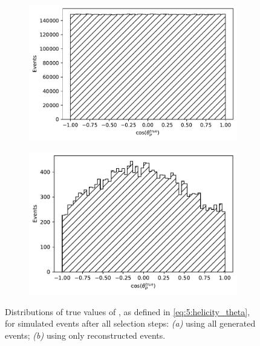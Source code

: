 \begin{figure}[t]
	\centering
	\begin{subfigure}{.45\textwidth}
		\includegraphics[height=.2\textheight]{graphics/05-angular_distributions/MCTRUTH_theta_true.pdf}
		\caption{}
		\label{fig:5:MCTRUTH_theta_true}
	\end{subfigure}
	\begin{subfigure}{.45\textwidth}
		\includegraphics[height=.2\textheight]{graphics/05-angular_distributions/MCRECO_theta_true.pdf}
		\caption{}
		\label{fig:5:MCRECO_theta_true}
	\end{subfigure}
	\caption{Distributions of true values of \cthetap, as defined in \eqref{eq:5:helicity_theta}, for simulated \demonstratorshort events after all selection steps: \textit{(a)} using all generated events; \textit{(b)} using only reconstructed events.}
	\label{fig:5:theta_distributions_true}
\end{figure}

